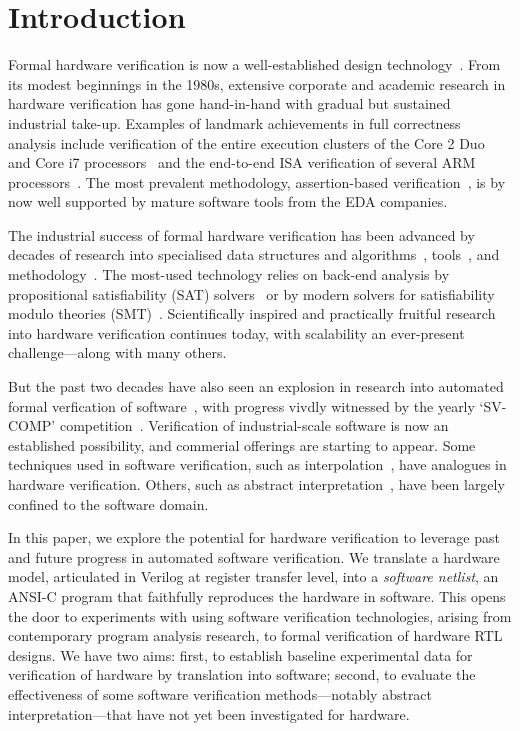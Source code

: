 \section{Introduction}\label{sec:intro}
%
Formal hardware verification is now a well-established design technology~\cite{Seligman:2015:FV}. From its modest beginnings in the 1980s, extensive corporate and academic research in hardware verification has gone hand-in-hand with gradual but sustained industrial take-up. Examples of landmark achievements in full correctness analysis include verification of the entire execution clusters of the Core 2 Duo~\cite{Core2}  and Core i7 processors~\cite{i7} and the end-to-end ISA verification of several ARM processors~\cite{ARM}. The most prevalent methodology, assertion-based verification~\cite{Foster:2009:AAB}, is by now well supported by mature software tools from the EDA companies.

The industrial success of formal hardware verification has been advanced by decades of research into specialised data structures and algorithms~\cite{ic3,fmcad2000,ken,biere,STE}, tools~\cite{Seger:2005:IEE,abc,ebmc,vis,cadence,synopsysfv}, and methodology~\cite{MCMILLAN2000279,Aagaard:2000:MLH,uclid,word-term,word-bmc,DBLP:conf/lpar/AndrausLS08}.  The most-used technology relies on back-end analysis by propositional satisfiability (SAT) solvers~\cite{Biere1999} or by modern solvers for satisfiability modulo theories (SMT)~\cite{decision_procedures, DBLP:conf/lpar/AndrausLS08,soc-keating,
DBLP:conf/mtv/SunkariCVM07,DBLP:conf/cav/Bjesse08}. Scientifically inspired and practically fruitful research into hardware verification continues today, with scalability an ever-present challenge---along with many others. 

But the past two decades have also seen an explosion in research into automated formal verfication of software~\cite{dkw2008}, with progress vivdly witnessed by the yearly `SV-COMP' competition~\cite{Beyer2017}.  Verification of industrial-scale software is now an established possibility, and commerial offerings are starting to appear. Some techniques used in software verification, such as interpolation~\cite{Interpolants,Kroening:2011:ISV}, have analogues in hardware verification. Others, such as abstract interpretation~\cite{CousotCousot77,Cousot:1996:AI}, have been largely confined to the software domain.  

In this paper, we explore the potential for hardware verification to leverage past and future progress in automated software verification. We translate a hardware model, articulated in Verilog at register transfer level, into a \emph{software netlist}, an ANSI-C program that faithfully reproduces the hardware in software. This opens the door to experiments with using software verification technologies, arising from contemporary program analysis research, to formal verification of hardware RTL designs. We have two aims: first, to establish baseline experimental data for verification of hardware by translation into software; second, to evaluate the effectiveness of some software verification methods---notably abstract interpretation---that have not yet been investigated for hardware.

